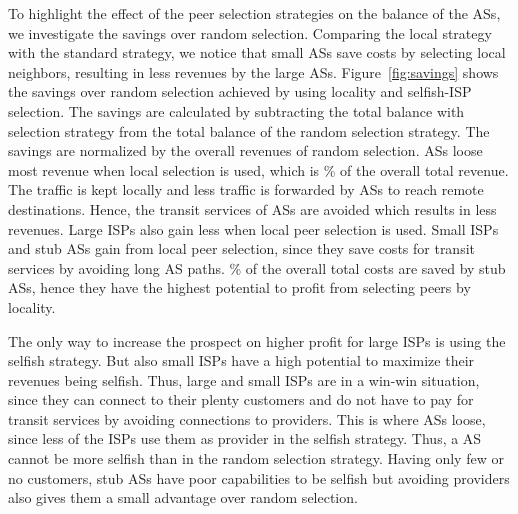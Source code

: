 To highlight the effect of the peer selection strategies on the balance of the ASs, we investigate the savings over random selection.
Comparing the local strategy with the standard strategy, we notice that small ASs save costs by selecting local neighbors, resulting in less revenues by the large ASs.
Figure~\ref{fig:savings} shows the savings over random selection achieved by using locality and selfish-ISP selection. The savings are calculated by subtracting the total balance with selection strategy from the total balance of the random selection strategy. The savings are normalized by the overall revenues of random selection. \tier ASs loose most revenue when local selection is used, which is \unit[10]{\%} of the overall total revenue. The traffic is kept locally and less traffic is forwarded by \tier ASs to reach remote destinations. Hence, the transit services of \tier ASs are avoided which results in less revenues. Large ISPs also gain less when local peer selection is used. Small ISPs and stub ASs gain from local peer selection, since they save costs for transit services by avoiding long AS paths. \unit[10]{\%} of the overall total costs are saved by stub ASs, hence they have the highest potential to profit from selecting peers by locality.



The only way to increase the prospect on higher profit for large ISPs is using the selfish strategy. But also small ISPs have a high potential to maximize their revenues being selfish. Thus, large and small ISPs are in a win-win situation, since they can connect to their plenty customers and do not have to pay for transit services by avoiding connections to providers. This is where \tier ASs loose, since less of the ISPs use them as provider in the selfish strategy. Thus, a \tier AS cannot be more selfish than in the random selection strategy. Having only few or no customers, stub ASs have poor capabilities to be selfish but avoiding providers also gives them a small advantage over random selection.

